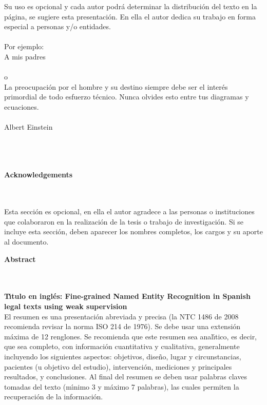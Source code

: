 \begin{flushright}
\begin{minipage}{8cm}
    \noindent
        \small
        Su uso es opcional y cada autor podr\'{a} determinar la distribuci\'{o}n del texto en la p\'{a}gina, se sugiere esta presentaci\'{o}n. En ella el autor dedica su trabajo en forma especial a personas y/o entidades.\\[1.0cm]\\
        Por ejemplo:\\[1.0cm]
        A mis padres\\[1.0cm]\\
        o\\[1.0cm]
        La preocupaci\'{o}n por el hombre y su destino siempre debe ser el
        inter\'{e}s primordial de todo esfuerzo t\'{e}cnico. Nunca olvides esto
        entre tus diagramas y ecuaciones.\\\\
        Albert Einstein\\
\end{minipage}
\end{flushright}

\newpage{\pagestyle{empty}\cleardoublepage}

\newpage
\thispagestyle{empty} \textbf{}\normalsize
\\\\\\%
\textbf{\LARGE Acknowledgements}
\\\\
Esta secci\'{o}n es opcional, en ella el autor agradece a las personas o instituciones que colaboraron en la realizaci\'{o}n de la tesis  o trabajo de investigaci\'{o}n. Si se incluye esta secci\'{o}n, deben aparecer los nombres completos, los cargos y su aporte al documento.\\

\newpage{\pagestyle{empty}\cleardoublepage}

\newpage
\textbf{\LARGE Abstract}
\\\\
\textbf{T\'{\i}tulo en ingl\'{e}s: Fine-grained Named Entity Recognition in Spanish legal texts using weak supervision}\\[0.5cm]
El resumen es una presentaci\'{o}n abreviada y precisa (la NTC 1486 de 2008 recomienda revisar la norma ISO 214 de 1976). Se debe usar una extensi\'{o}n m\'{a}xima de 12 renglones. Se recomienda que este resumen sea anal\'{\i}tico, es decir, que sea completo, con informaci\'{o}n cuantitativa y cualitativa, generalmente incluyendo los siguientes aspectos: objetivos, dise\~{n}o, lugar y circunstancias, pacientes (u objetivo del estudio), intervenci\'{o}n, mediciones y principales resultados, y conclusiones. Al final del resumen se deben usar palabras claves tomadas del texto (m\'{\i}nimo 3 y m\'{a}ximo 7 palabras), las cuales permiten la recuperaci\'{o}n de la informaci\'{o}n.\\

